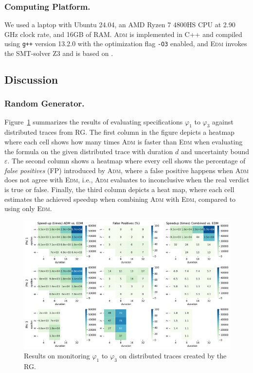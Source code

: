 \subsubsection{Computing Platform.}
We used a laptop with Ubuntu 24.04, an AMD Ryzen 7 4800HS CPU at 2.90 GHz clock rate, and 16GB of RAM.
\textsc{Adm} is implemented in C++ and compiled using \texttt{g++} version 13.2.0 with the optimization flag \texttt{-O3} enabled, and \textsc{Edm} invokes the SMT-solver Z3 \cite{MouraB08} and is based on \cite{MomtazAB23}.

\subsection{Discussion}

\subsubsection{Random Generator.}

Figure~\ref{fig:rgresults} summarizes the results of evaluating specifications $\varphi_1$ to $\varphi_3$ against distributed traces from RG. The first column in the figure depicts a heatmap where each cell shows how many times \textsc{Adm} is faster than \textsc{Edm} when evaluating the formula on the given distributed trace with duration $d$ and uncertainty bound $\varepsilon$. The second column shows a heatmap where every cell shows the percentage of \emph{false positives} (FP) introduced by \textsc{Adm}, where a false positive happens when \textsc{Adm} does not agree with \textsc{Edm}, i.e., \textsc{Adm} evaluates to inconclusive when the real verdict is true or false. Finally, the third column depicts a heat map, where each cell estimates the achieved speedup when combining \textsc{Adm} with \textsc{Edm}, compared to using only \textsc{Edm}.

\begin{figure}[t]
	\begin{center}
	\includegraphics[width=\linewidth]{speedup}
\caption{Results on monitoring $\varphi_{1}$ to $\varphi_{3}$ on distributed traces created by the RG.}
\label{fig:rgresults}
\end{center}
\end{figure}

